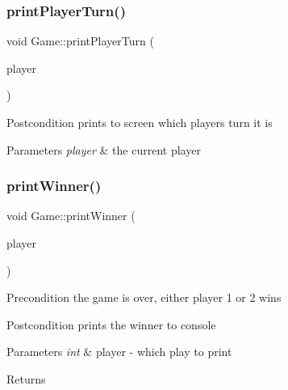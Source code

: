 \subsubsection{\texorpdfstring{print\+Player\+Turn()}{printPlayerTurn()}}
{\footnotesize\ttfamily void Game\+::print\+Player\+Turn (\begin{DoxyParamCaption}\item[{int}]{player }\end{DoxyParamCaption})}

\begin{DoxyPostcond}{Postcondition}
prints to screen which player\textquotesingle{}s turn it is 
\end{DoxyPostcond}

\begin{DoxyParams}{Parameters}
{\em player} & the current player \\
\hline
\end{DoxyParams}
\mbox{\label{classGame_aa8d9c78d73ff0c511c2602995e995993}} 
\subsubsection{\texorpdfstring{print\+Winner()}{printWinner()}}
{\footnotesize\ttfamily void Game\+::print\+Winner (\begin{DoxyParamCaption}\item[{int}]{player }\end{DoxyParamCaption})}

\begin{DoxyPrecond}{Precondition}
the game is over, either player 1 or 2 wins 
\end{DoxyPrecond}
\begin{DoxyPostcond}{Postcondition}
prints the winner to console 
\end{DoxyPostcond}

\begin{DoxyParams}{Parameters}
{\em int} & player -\/ which play to print \\
\hline
\end{DoxyParams}
\begin{DoxyReturn}{Returns}

\end{DoxyReturn}
\mbox{\label{classGame_abaeddb168166a7c6db3d7d82a6e160b5}} 
